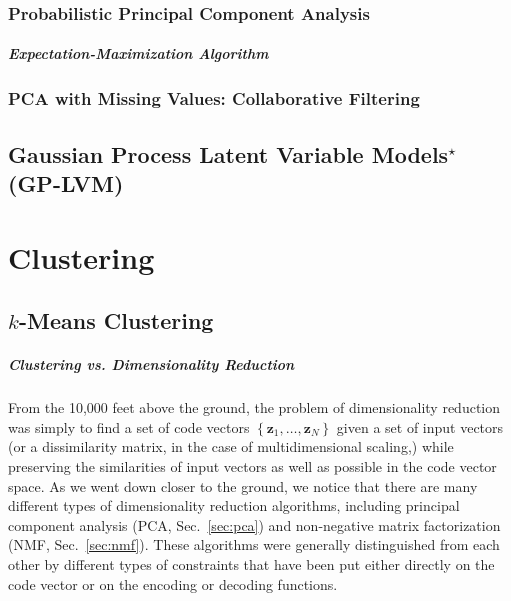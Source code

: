 \documentclass{report}
\newcommand{\vect}[1]{\mathbf{#1}}
\newcommand{\vz}[0]{\vect{z}}
\begin{document}
\subsection{Probabilistic Principal Component Analysis}

\paragraph{Expectation-Maximization Algorithm}

\subsection{PCA with Missing Values: Collaborative Filtering}

\section{Gaussian Process Latent Variable Models$^\star$ (GP-LVM)}


\chapter{Clustering}
\label{sec:cluster}

\section{$k$-Means Clustering}

\paragraph{Clustering vs. Dimensionality Reduction}

From the 10,000 feet above the ground, the problem of dimensionality reduction
was simply to find a set of code vectors $\left\{ \vz_1, \ldots, \vz_N \right\}$
given a set of input vectors (or a dissimilarity matrix, in the case of
multidimensional scaling,) while preserving the similarities of input vectors as
well as possible in the code vector space. As we went down closer to the ground,
we notice that there are many different types of dimensionality reduction
algorithms, including principal component analysis (PCA, Sec.~\ref{sec:pca}) and
non-negative matrix factorization (NMF, Sec.~\ref{sec:nmf}). These algorithms
were generally distinguished from each other by different types of constraints
that have been put either directly on the code vector or on the encoding or
decoding functions. 
\end{document}
